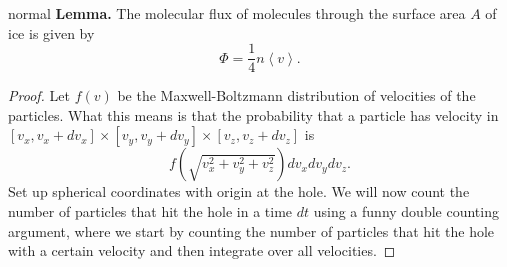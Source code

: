 \begin{solution}{normal}
\textbf{\textcolor{crimsonglory}{Lemma.}} The molecular flux of molecules through the surface area $A$ of ice is given by 
\[\Phi = \frac{1}{4}n\left<v\right>.\]
\begin{proof}
Let $f(v)$ be the Maxwell-Boltzmann distribution of velocities of the particles. What this means is that the probability that a particle has velocity in $[v_x,v_x+dv_x]\times[v_y,v_y+dv_y]\times[v_z,v_z+dv_z]$ is
\[f\left(\sqrt{v_x^2+v_y^2+v_z^2}\right)dv_xdv_ydv_z.\]Set up spherical coordinates with origin at the hole. We will now count the number of particles that hit the hole in a time $dt$ using a funny double counting argument, where we start by counting the number of particles that hit the hole with a certain velocity and then integrate over all velocities.


\end{proof}
\end{solution}
